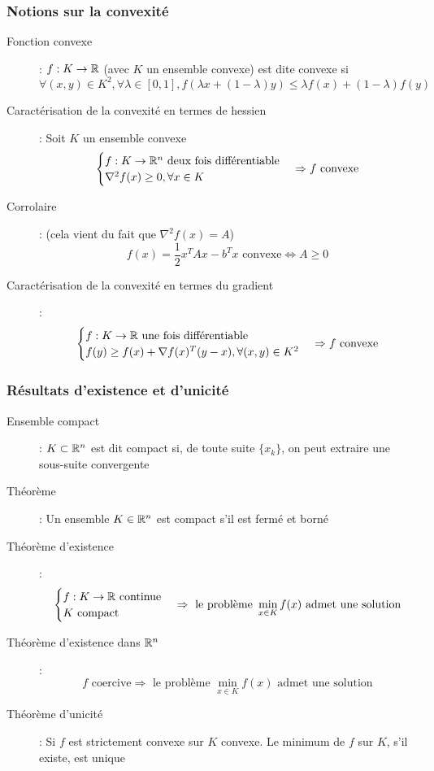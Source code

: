\subsubsection{Notions sur la convexité}
\begin{description}
\item[Fonction convexe] : $f:K\rightarrow\mathbb{R}$ (avec $K$ un ensemble convexe) est dite convexe si
    \[
        \forall(x,y)\in K^2,\forall\lambda\in [0,1], f(\lambda x+(1-\lambda)y) \le \lambda f(x) + (1-\lambda)f(y)
    \]
\item[Caractérisation de la convexité en termes de hessien] : Soit $K$ un ensemble convexe
    \[
        \begin{cases}
            f:K\rightarrow\mathbb{R}^n \textrm{ deux fois différentiable} \\
            \nabla^2f(x)\ge 0, \forall x\in K
        \end{cases}
        \Rightarrow
        f\textrm{ convexe}
    \]
\item[Corrolaire] : (cela vient du fait que $\nabla^2f(x) = A$)
    \[
        f(x) = \frac{1}{2}x^TAx-b^Tx\textrm{ convexe}
        \Leftrightarrow
        A\ge 0
    \]
\item[Caractérisation de la convexité en termes du gradient] :
    \[
        \begin{cases}
            f:K\rightarrow\mathbb{R}\textrm{ une fois différentiable}\\
            f(y)\ge f(x) + \nabla f(x)^T(y-x), \forall(x,y)\in K^2
        \end{cases}
        \Rightarrow
        f\textrm{ convexe}
    \]
\end{description}
\subsubsection{Résultats d'existence et d'unicité}
\begin{description}
\item[Ensemble compact] : $K\subset\mathbb{R}^n$ est dit compact si, de toute suite $\{x_k\}$, on peut extraire une sous-suite convergente
\item[Théorème] : Un ensemble $K\in\mathbb{R}^n$ est compact s'il est fermé et borné
\item[Théorème d'existence] : 
    \[
        \begin{cases}
            f:K\rightarrow\mathbb{R}\textrm{ continue}\\
            K\textrm{ compact}
        \end{cases}
        \Rightarrow
        \textrm{ le problème }\min_{x\in K} f(x)
        \textrm{ admet une solution}
    \]
\item[Théorème d'existence dans $\mathbb{R}^n$] :
    \[
        f\textrm{ coercive}\Rightarrow
        \textrm{ le problème }\min_{x\in K} f(x)
        \textrm{ admet une solution}
    \]
\item[Théorème d'unicité] : Si $f$ est strictement convexe sur $K$ convexe. Le minimum de $f$ sur $K$, s'il existe, est unique
\end{description}
